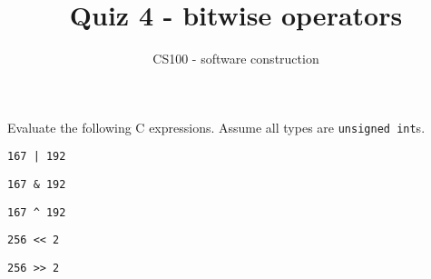 \documentclass{article}
\title{Quiz 4 - bitwise operators}
\author{CS100 - software construction}
\begin{document}
\maketitle

\noindent
Evaluate the following C expressions.  Assume all types are \lstinline{unsigned int}s.

\vspace{0.25in}

 \lstinline{167 | 192}

\vspace{1in}

 \lstinline{167 & 192}

\vspace{1in}

 \lstinline{167 ^ 192}

\vspace{1in}

 \lstinline{256 << 2}

\vspace{1in}

 \lstinline {256 >> 2}
\end{document}
